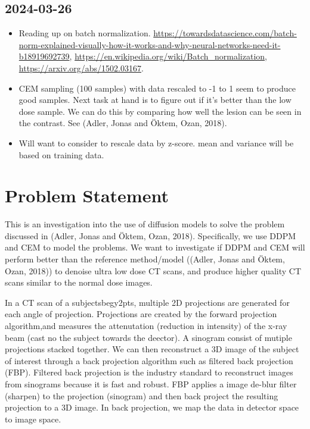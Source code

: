 \documentclass[a4paper, 11pt]{article}
\begin{document}
\subsection{2024-03-26}
\label{sec:orge28b071}
\begin{itemize}
\item Reading up on batch normalization. \url{https://towardsdatascience.com/batch-norm-explained-visually-how-it-works-and-why-neural-networks-need-it-b18919692739}, \url{https://en.wikipedia.org/wiki/Batch\_normalization}, \url{https://arxiv.org/abs/1502.03167}.
\item CEM sampling (100 samples) with data rescaled to -1 to 1 seem to produce good samples. Next task at hand is to figure out if it's better than the low dose sample. We can do this by comparing how well the lesion can be seen in the contrast. See (Adler, Jonas and Öktem, Ozan, 2018).
\item Will want to consider to rescale data by z-score. mean and variance will be based on training data.
\end{itemize}
\section{Problem Statement}
\label{sec:org1b5de5b}
This is an investigation into the use of diffusion models to solve the problem discussed in (Adler, Jonas and Öktem, Ozan, 2018). Specifically, we use DDPM and CEM to model the problems. We want to investigate if DDPM and CEM will perform better than the reference method/model ((Adler, Jonas and Öktem, Ozan, 2018)) to denoise ultra low dose CT scans, and produce higher quality CT scans similar to the normal dose images.

In a CT scan of a subjectsbegy2pts, multiple 2D projections are generated for each angle of projection. Projections are created by the forward projection algorithm,and measures the attenutation (reduction in intensity) of the x-ray beam (cast no the subject towards the deector). A sinogram consist of mutiple projections stacked together. We can then reconstruct a 3D image of the subject of interest through a back projection algorithm such as filtered back projection (FBP). Filtered back projection is the industry standard to reconstruct images from sinograms because it is fast and robust. FBP applies a image de-blur filter (sharpen) to the projection (sinogram) and then back project the resulting projection to a 3D image. In back projection, we map the data in detector space to image space.
\end{document}
